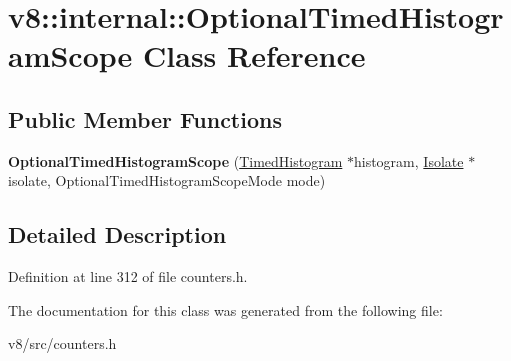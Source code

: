 \hypertarget{classv8_1_1internal_1_1OptionalTimedHistogramScope}{}\section{v8\+:\+:internal\+:\+:Optional\+Timed\+Histogram\+Scope Class Reference}
\label{classv8_1_1internal_1_1OptionalTimedHistogramScope}
\subsection*{Public Member Functions}
\begin{DoxyCompactItemize}
\item 
\mbox{\label{classv8_1_1internal_1_1OptionalTimedHistogramScope_ad64e901a5fae05fd4f1b40569443ded6}} 
{\bfseries Optional\+Timed\+Histogram\+Scope} (\mbox{\hyperlink{classv8_1_1internal_1_1TimedHistogram}{Timed\+Histogram}} $\ast$histogram, \mbox{\hyperlink{classv8_1_1internal_1_1Isolate}{Isolate}} $\ast$isolate, Optional\+Timed\+Histogram\+Scope\+Mode mode)
\end{DoxyCompactItemize}


\subsection{Detailed Description}


Definition at line 312 of file counters.\+h.



The documentation for this class was generated from the following file\+:\begin{DoxyCompactItemize}
\item 
v8/src/counters.\+h\end{DoxyCompactItemize}
